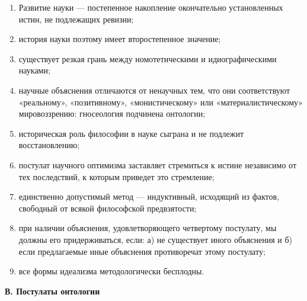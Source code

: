\begin{enumerate}

  \item Развитие науки --- постепенное накопление окончательно
        установленных истин, не подлежащих ревизии;

  \item история науки поэтому имеет второстепенное значение;

  \item существует резкая грань между номотетическими и
        идиографическими науками;

  \item научные объяснения отличаются от ненаучных тем, что они
        соответствуют «реальному», «позитивному», «монистическому»
        или «материалистическому» мировоззрению: гносеология
        подчинена онтологии;

  \item историческая роль философии в науке сыграна и не подлежит
        восстановлению;

  \item постулат научного оптимизма заставляет стремиться к истине
        независимо от тех последствий, к которым приведет это
        стремление;

  \item единственно допустимый метод --- индуктивный, исходящий из
        фактов, свободный от всякой философской предвзятости;

  \item при наличии объяснения, удовлетворяющего четвертому
        постулату, мы должны его придерживаться, если: а) не
        существует иного объяснения и б) если предлагаемые иные
        объяснения противоречат этому постулату;

  \item все формы идеализма методологически бесплодны.

\end{enumerate}

\begin{center}

  \textbf{В. Постулаты онтологии}

\end{center}

